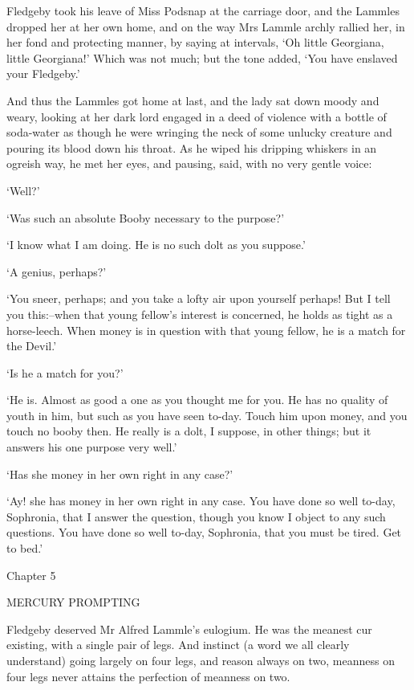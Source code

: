 Fledgeby took his leave of Miss Podsnap at the carriage door, and the
Lammles dropped her at her own home, and on the way Mrs Lammle archly
rallied her, in her fond and protecting manner, by saying at intervals,
‘Oh little Georgiana, little Georgiana!’ Which was not much; but the
tone added, ‘You have enslaved your Fledgeby.’

And thus the Lammles got home at last, and the lady sat down moody and
weary, looking at her dark lord engaged in a deed of violence with a
bottle of soda-water as though he were wringing the neck of some unlucky
creature and pouring its blood down his throat. As he wiped his dripping
whiskers in an ogreish way, he met her eyes, and pausing, said, with no
very gentle voice:

‘Well?’

‘Was such an absolute Booby necessary to the purpose?’

‘I know what I am doing. He is no such dolt as you suppose.’

‘A genius, perhaps?’

‘You sneer, perhaps; and you take a lofty air upon yourself perhaps!
But I tell you this:--when that young fellow’s interest is concerned,
he holds as tight as a horse-leech. When money is in question with that
young fellow, he is a match for the Devil.’

‘Is he a match for you?’

‘He is. Almost as good a one as you thought me for you. He has no
quality of youth in him, but such as you have seen to-day. Touch him
upon money, and you touch no booby then. He really is a dolt, I suppose,
in other things; but it answers his one purpose very well.’

‘Has she money in her own right in any case?’

‘Ay! she has money in her own right in any case. You have done so well
to-day, Sophronia, that I answer the question, though you know I object
to any such questions. You have done so well to-day, Sophronia, that you
must be tired. Get to bed.’



Chapter 5

MERCURY PROMPTING


Fledgeby deserved Mr Alfred Lammle’s eulogium. He was the meanest
cur existing, with a single pair of legs. And instinct (a word we all
clearly understand) going largely on four legs, and reason always on
two, meanness on four legs never attains the perfection of meanness on
two.


